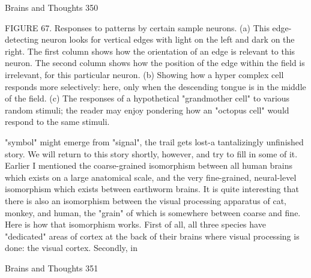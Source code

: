 Brains and Thoughts                                                                        350

FIGURE       67.    Responses      to    patterns    by    certain    sample     neurons.
             (a) This edge-detecting neuron looks for vertical edges with light on the left
             and dark on the right. The first column shows how the orientation of an
             edge is relevant to this neuron. The second column shows how the position
             of the edge within the field is irrelevant, for this particular neuron. (b)
             Showing how a hyper complex cell responds more selectively: here, only
             when the descending tongue is in the middle of the field. (c) The responses
             of a hypothetical "grandmother cell" to various random stimuli; the reader
             may enjoy pondering how an "octopus cell" would respond to the same
             stimuli.

  "symbol" might emerge from "signal", the trail gets lost-a tantalizingly unfinished story.
We will return to this story shortly, however, and try to fill in some of it.
  Earlier I mentioned the coarse-grained isomorphism between all human brains which
exists on a large anatomical scale, and the very fine-grained, neural-level isomorphism
which exists between earthworm brains. It is quite interesting that there is also an
isomorphism between the visual processing apparatus of cat, monkey, and human, the
"grain" of which is somewhere between coarse and fine. Here is how that isomorphism
works. First of all, all three species have "dedicated" areas of cortex at the back of their
brains where visual processing is done: the visual cortex. Secondly, in




Brains and Thoughts                                                                     351

